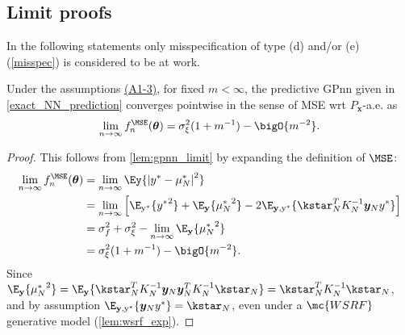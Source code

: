 \subsection{Limit proofs}
\label{sec:limit_proofs}
In the following statements only misspecification of type (d) and/or (e) (\autoref{misspec}) is considered to be at work.


\begin{lemma}
    \label{lem:mse_limit}
    Under the assumptions \hyperref[{desc:assumptions_gpnn}]{(A1-3)}, for fixed \(m<\infty\), the predictive GPnn given in \autoref{exact_NN_prediction} converges pointwise in the sense of MSE wrt \(P_\mathbf{x}\)-a.e. as
    \[\lim_{n\rightarrow\infty}f_n^{\MSE}(\bm{\theta}) = \sigma_\xi^2(1+m^{-1}) - \bigO{m^{-2}}.\]
\end{lemma}
\begin{proof}\label{proof:mse_limit}
    This follows from \autoref{lem:gpnn_limit} by expanding the definition
    of \(\MSE\):
    \begin{align*}
        \lim_{n\rightarrow\infty}f_n^{\MSE}(\bm{\theta})
        &=\lim_{n\rightarrow\infty}\Ey{\abs{y^* - \mu_N^*}^2} \\
        &= \lim_{n\rightarrow\infty}\left[\E_\mathrm{y^*}\{{y^*}^2\} + \E_\mathbf{y}\{{\mu^*_N}^2\} - 2\E_{\mathbf{y},\mathrm{y^*}}\{\kstar_N^TK_N^{-1}\bm{y}_Ny^*\}\right]\\
        &= \sigma_f^2 + \sigma_\xi^2 -
        \lim_{n\rightarrow\infty}\E_\mathbf{y}\{{\mu^*_N}^2\} \\
        &= \sigma_\xi^2(1 +m^{-1}) - \bigO{m^{-2}}.
    \end{align*}
    Since \(\E_\mathbf{y}\{{\mu^*_N}^2\}=\E_\mathbf{y}\{\kstar_N^TK_N^{-1}\bm{y}_N\bm{y}_N^TK_N^{-1}\kstar_N\}=\kstar_N^TK_N^{-1}\kstar_N\), and by assumption \(\E_{\mathbf{y},\mathrm{y^*}}\{\bm{y}_Ny^*\}=\kstar_N\), even under a \(\mc{WSRF}\) generative model (\autoref{lem:wsrf_exp}).
\end{proof}

